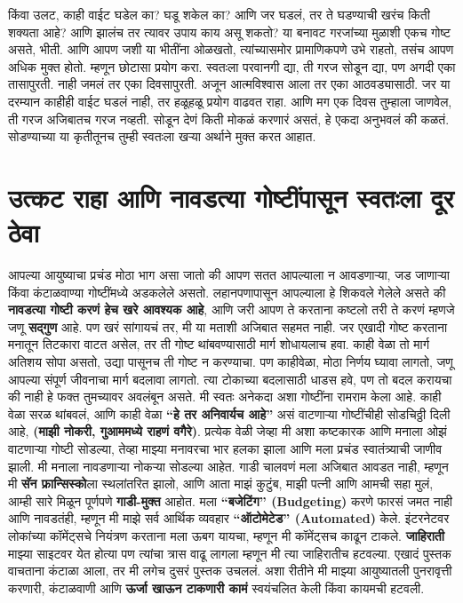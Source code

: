  किंवा उलट,  काही वाईट घडेल का? घडू शकेल का? आणि जर घडलं, तर ते घडण्याची खरंच किती शक्यता आहे? आणि झालंच तर त्यावर उपाय काय असू शकतो?
या बनावट गरजांच्या मुळाशी एकच गोष्ट असते,  भीती. आणि आपण जशी या भीतींना ओळखतो, त्यांच्यासमोर प्रामाणिकपणे उभे राहतो, तसंच आपण अधिक मुक्त होतो.
 म्हणून छोटासा प्रयोग करा. स्वतःला परवानगी द्या,  ती गरज सोडून द्या, पण अगदी एका तासापुरती. नाही जमलं तर एका दिवसापुरती. अजून आत्मविश्वास आला तर एका आठवड्यासाठी. जर या दरम्यान काहीही वाईट घडलं नाही, तर हळूहळू प्रयोग वाढवत राहा. आणि मग एक दिवस तुम्हाला जाणवेल,  ती गरज अजिबातच गरज नव्हती.
सोडून देणं किती मोकळं करणारं असतं, हे एकदा अनुभवलं की कळतं. सोडण्याच्या या कृतीतूनच तुम्ही स्वतःला खऱ्या अर्थाने मुक्त करत आहात.
 
 \chapter{उत्कट राहा आणि नावडत्या गोष्टींपासून स्वतःला दूर ठेवा}
आपल्या आयुष्याचा प्रचंड मोठा भाग असा जातो की आपण सतत आपल्याला न आवडणाऱ्या, जड जाणाऱ्या किंवा कंटाळवाण्या गोष्टींमध्ये अडकलेले असतो. लहानपणापासून आपल्याला हे शिकवले गेलेले असते की \textbf{नावडत्या गोष्टी करणं हेच खरे आवश्यक आहे}, आणि जरी आपण ते करताना कष्टलो तरी ते करणं म्हणजे जणू \textbf{सद्गुण} आहे. पण खरं सांगायचं तर, मी या मताशी अजिबात सहमत नाही.
जर एखादी गोष्ट करताना मनातून तिटकारा वाटत असेल, तर ती गोष्ट थांबवण्यासाठी मार्ग शोधायलाच हवा. काही वेळा तो मार्ग अतिशय सोपा असतो, उद्या पासूनच ती गोष्ट न करण्याचा. पण काहीवेळा, मोठा निर्णय घ्यावा लागतो, जणू आपल्या संपूर्ण जीवनाचा मार्ग बदलावा लागतो. त्या टोकाच्या बदलासाठी धाडस हवे, पण तो बदल करायचा की नाही हे फक्त तुमच्यावर अवलंबून असते.
मी स्वतः अनेकदा अशा गोष्टींना रामराम केला आहे. काही वेळा सरळ थांबवलं, आणि काही वेळा \textbf{“हे तर अनिवार्यच आहे”} असं वाटणाऱ्या गोष्टींचीही सोडचिठ्ठी दिली आहे, \textbf{(माझी नोकरी, गुआममध्ये राहणं वगैरे)}. प्रत्येक वेळी जेव्हा मी अशा कष्टकारक आणि मनाला ओझं वाटणाऱ्या गोष्टी सोडल्या, तेव्हा माझ्या मनावरचा भार हलका झाला आणि मला प्रचंड स्वातंत्र्याची जाणीव झाली.
मी मनाला नावडणाऱ्या नोकऱ्या सोडल्या आहेत. गाडी चालवणं मला अजिबात आवडत नाही, म्हणून मी \textbf{सॅन फ्रान्सिस्को}ला स्थलांतरित झालो, आणि आता माझं कुटुंब, माझी पत्नी आणि आमची सहा मुलं, आम्ही सारे मिळून पूर्णपणे \textbf{गाडी-मुक्त} आहोत. मला \textbf{“बजेटिंग” (Budgeting)} करणे फारसं जमत नाही आणि नावडतंही, म्हणून मी माझे सर्व आर्थिक व्यवहार \textbf{“ऑटोमेटेड” (Automated)} केले. इंटरनेटवर लोकांच्या कॉमेंट्सचे नियंत्रण करताना मला ऊबग यायचा, म्हणून मी कॉमेंट्सच काढून टाकले. \textbf{जाहिराती} माझ्या साइटवर येत होत्या पण त्यांचा त्रास वाढू लागला म्हणून मी त्या जाहिरातीच हटवल्या. एखादं पुस्तक वाचताना कंटाळा आला, तर मी लगेच दुसरं पुस्तक उचललं. अशा रीतीने मी माझ्या आयुष्यातली पुनरावृत्ती करणारी, कंटाळवाणी आणि \textbf{ऊर्जा खाऊन टाकणारी कामं} स्वयंचलित केली किंवा कायमची हटवली.

